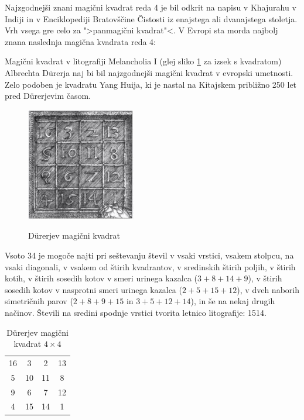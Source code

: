 \documentclass[a4paper,12pt]{article}
\begin{document}
Najzgodnejši znani magični kvadrat reda 4 je bil odkrit na napisu
v Khajurahu v Indiji in v Enciklopediji Bratovščine Čistosti iz enajstega
ali dvanajstega stoletja. Vrh vsega gre celo za ">panmagični kvadrat"<.
V Evropi sta morda najbolj znana naslednja magična kvadrata reda 4:

Magični kvadrat v litografiji Melancholia I (glej sliko \ref{fig:durer}
za izsek s kvadratom) Albrechta Dürerja naj bi bil najzgodnejši magični kvadrat
v evropski umetnosti. Zelo podoben je kvadratu Yang Huija, ki je nastal na Kitajskem
približno 250 let pred Dürerjevim časom. %

\begin{figure}
   \caption{Dürerjev magični kvadrat}
   \includegraphics[scale=1.5]{durer.png}
   \label{fig:durer}
\end{figure}

Vsoto 34 je mogoče najti pri seštevanju števil v vsaki vrstici, vsakem stolpcu,
na vsaki diagonali, v vsakem od štirih kvadrantov, v sredinskih štirih poljih,
v štirih kotih, v štirih sosedih kotov v smeri urinega kazalca ($3+8+14+9$), v
štirih sosedih kotov v nasprotni smeri urinega kazalca ($2+5+15+12$), v dveh naborih
simetričnih parov ($2+8+9+15$ in $3+5+12+14$), in še na nekaj drugih načinov.
Števili na sredini spodnje vrstici tvorita letnico litografije: 1514.
%
\begin{table}
   \centering
   \caption{Dürerjev magični kvadrat $4\times 4$}
   \label{table:durer}
   \begin{tabular}{cccc} \toprule
        16 &  3 &  2 & 13 \\
         5 & 10 & 11 &  8 \\
         9 &  6 &  7 & 12 \\
         4 & 15 & 14 &  1 \\ \bottomrule
   \end{tabular}
\end{table}
\end{document}
